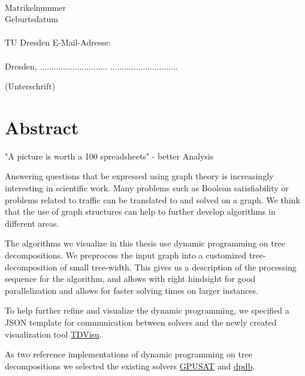 \documentclass[a4paper, 12pt, bibliography=totoc]{scrartcl}
\begin{document}
\noindent
\myauthor \\
Matrikelnummer \mymatriculation\\
Geburtsdatum \mybirthday\\\\
TU Dresden E-Mail-Adresse:\\
 \myemail\\[40pt]


Dresden,  ............................. \hfill .............................
\begin{flushright}
	(Unterschrift)\hspace{1em}
\end{flushright}


\newpage

\section*{Abstract}
\vspace{4ex}

"A picture is worth a 100 spreadsheets" - better Analysis
 
Answering questions that be expressed using graph theory is increasingly interesting in scientific work.
Many problems such as Boolean satisfiability or problems related to traffic can be translated to and solved on a graph.
We think that the use of graph structures can help to further develop algorithms in different areas.

The algorithms we visualize in this thesis use dynamic programming on tree decompositions.
We preprocess the input graph into a customized tree-decomposition of small tree-width.
This gives us a description of the processing sequence for the algorithm, and allows 
with right hindsight for good parallelization and allows for faster solving times on larger instances.

To help further refine and visualize the dynamic programming,
we specified a JSON template for communication between solvers and the newly created visualization tool \href{https://github.com/VaeterchenFrost/tdvisu}{TDVisu}.

As two reference implementations of dynamic programming on tree decompositions we selected the existing solvers \href{https://github.com/daajoe/GPUSAT}{GPUSAT} and \href{https://github.com/hmarkus/dp_on_dbs}{dpdb}.
\end{document}
